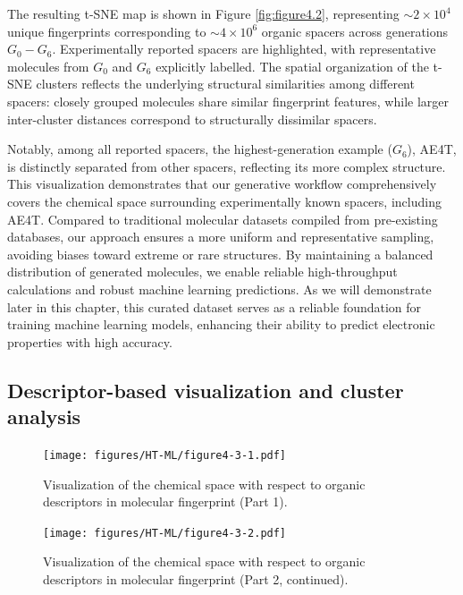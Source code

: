 The resulting t-SNE map is shown in Figure \ref{fig:figure4.2}, representing $\sim2\times10^4$ unique fingerprints corresponding to $\sim4\times10^6$ organic spacers across generations $G_0-G_6$. Experimentally reported spacers are highlighted, with representative molecules from $G_0$ and $G_6$ explicitly labelled. The spatial organization of the t-SNE clusters reflects the underlying structural similarities among different spacers: closely grouped molecules share similar fingerprint features, while larger inter-cluster distances correspond to structurally dissimilar spacers.

Notably, among all reported spacers, the highest-generation example ($G_6$), AE4T\cite{RN38}, is distinctly separated from other spacers, reflecting its more complex structure. This visualization demonstrates that our generative workflow comprehensively covers the chemical space surrounding experimentally known spacers, including AE4T. Compared to traditional molecular datasets compiled from pre-existing databases, our approach ensures a more uniform and representative sampling, avoiding biases toward extreme or rare structures. By maintaining a balanced distribution of generated molecules, we enable reliable high-throughput calculations and robust machine learning predictions. As we will demonstrate later in this chapter, this curated dataset serves as a reliable foundation for training machine learning models, enhancing their ability to predict electronic properties with high accuracy.

\subsection{Descriptor-based visualization and cluster analysis}

\begin{figure}[htbp]
    \centering
    \texttt{[image: figures/HT-ML/figure4-3-1.pdf]}
    \caption{Visualization of the chemical space with respect to organic descriptors in molecular fingerprint (Part 1).}
    \label{fig:figure4.3}
\end{figure}

\begin{figure}[htbp]
    \centering
    \ContinuedFloat
    \texttt{[image: figures/HT-ML/figure4-3-2.pdf]}
    \caption{Visualization of the chemical space with respect to organic descriptors in molecular fingerprint (Part 2, continued).}
\end{figure}

